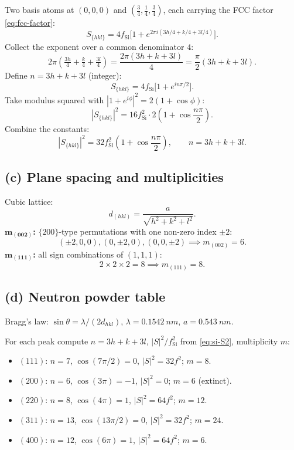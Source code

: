 \documentclass[11pt]{article}
\begin{document}
Two basis atoms at $(0,0,0)$ and $(\tfrac34,\tfrac14,\tfrac34)$, each carrying the FCC factor \eqref{eq:fcc-factor}:
\[
S_{\{hkl\}} = 4 f_\text{Si}\bigl[1 + e^{2\pi i(3h/4 + k/4 + 3l/4)}\bigr].
\]
Collect the exponent over a common denominator $4$:
\[
2\pi\!\left(\tfrac{3h}{4} + \tfrac{k}{4} + \tfrac{3l}{4}\right) = \frac{2\pi(3h+k+3l)}{4} = \frac{\pi}{2}(3h+k+3l).
\]
Define $n = 3h+k+3l$ (integer):
\[
S_{\{hkl\}} = 4 f_\text{Si}\bigl[1 + e^{i n\pi/2}\bigr].
\]
Take modulus squared with $|1+e^{i\phi}|^2 = 2(1+\cos\phi)$:
\[
|S_{\{hkl\}}|^2 = 16 f_\text{Si}^2 \cdot 2\!\left(1+\cos\frac{n\pi}{2}\right).
\]
Combine the constants:
\begin{equation}
\boxed{\;|S_{\{hkl\}}|^2 = 32 f_\text{Si}^2\!\left(1+\cos\frac{n\pi}{2}\right),\qquad n = 3h+k+3l.\;}
\label{eq:si-S2}
\end{equation}

\subsection*{(c) Plane spacing and multiplicities}

Cubic lattice:
\[
\boxed{\;d_{(hkl)} = \frac{a}{\sqrt{h^2+k^2+l^2}}.\;}
\]
\textbf{$\bm{m_{(002)}}$:} $\{200\}$-type permutations with one non-zero index $\pm 2$:
\[
(\pm 2,0,0),(0,\pm 2,0),(0,0,\pm 2)\implies m_{(002)} = 6.
\]
\textbf{$\bm{m_{(111)}}$:} all sign combinations of $(1,1,1)$:
\[
2\times 2\times 2 = 8\implies m_{(111)} = 8.
\]

\subsection*{(d) Neutron powder table}

Bragg's law: $\sin\theta = \lambda/(2 d_{hkl})$, $\lambda = \SI{0.1542}{nm}$, $a = \SI{0.543}{nm}$.

For each peak compute $n=3h+k+3l$, $|S|^2/f_\text{Si}^2$ from \eqref{eq:si-S2}, multiplicity $m$:
\begin{itemize}
\item $(111)$: $n=7$, $\cos(7\pi/2)=0$, $|S|^2=32 f^2$; $m=8$.
\item $(200)$: $n=6$, $\cos(3\pi)=-1$, $|S|^2=0$; $m=6$ (extinct).
\item $(220)$: $n=8$, $\cos(4\pi)=1$, $|S|^2=64 f^2$; $m=12$.
\item $(311)$: $n=13$, $\cos(13\pi/2)=0$, $|S|^2=32 f^2$; $m=24$.
\item $(400)$: $n=12$, $\cos(6\pi)=1$, $|S|^2=64 f^2$; $m=6$.
\end{itemize}
\end{document}
